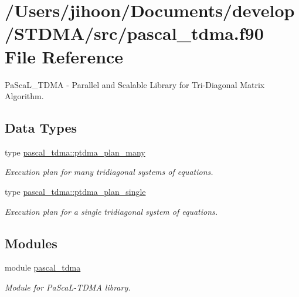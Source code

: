 \hypertarget{pascal__tdma_8f90}{}\section{/\+Users/jihoon/\+Documents/develop/\+S\+T\+D\+M\+A/src/pascal\+\_\+tdma.f90 File Reference}
\label{pascal__tdma_8f90}


Pa\+Sca\+L\+\_\+\+T\+D\+MA -\/ Parallel and Scalable Library for Tri-\/\+Diagonal Matrix Algorithm.  


\subsection*{Data Types}
\begin{DoxyCompactItemize}
\item 
type \mbox{\hyperlink{structpascal__tdma_1_1ptdma__plan__many}{pascal\+\_\+tdma\+::ptdma\+\_\+plan\+\_\+many}}
\begin{DoxyCompactList}\small\item\em Execution plan for many tridiagonal systems of equations. \end{DoxyCompactList}\item 
type \mbox{\hyperlink{structpascal__tdma_1_1ptdma__plan__single}{pascal\+\_\+tdma\+::ptdma\+\_\+plan\+\_\+single}}
\begin{DoxyCompactList}\small\item\em Execution plan for a single tridiagonal system of equations. \end{DoxyCompactList}\end{DoxyCompactItemize}
\subsection*{Modules}
\begin{DoxyCompactItemize}
\item 
module \mbox{\hyperlink{namespacepascal__tdma}{pascal\+\_\+tdma}}
\begin{DoxyCompactList}\small\item\em Module for Pa\+Sca\+L-\/\+T\+D\+MA library. \end{DoxyCompactList}\end{DoxyCompactItemize}
